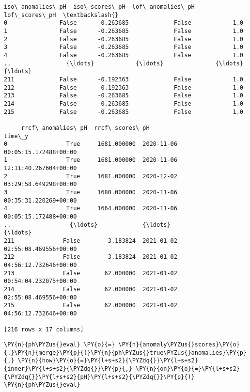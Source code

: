 \begin{tcolorbox}[breakable, size=fbox, boxrule=.5pt, pad at break*=1mm, opacityfill=0]
\begin{Verbatim}[commandchars=\\\{\}]
     iso\_anomalies\_pH  iso\_scores\_pH  lof\_anomalies\_pH  lof\_scores\_pH  \textbackslash{}
0               False      -0.263685             False            1.0
1               False      -0.263685             False            1.0
2               False      -0.263685             False            1.0
3               False      -0.263685             False            1.0
4               False      -0.263685             False            1.0
..                {\ldots}            {\ldots}               {\ldots}            {\ldots}
211             False      -0.192363             False            1.0
212             False      -0.192363             False            1.0
213             False      -0.263685             False            1.0
214             False      -0.263685             False            1.0
215             False      -0.263685             False            1.0

     rrcf\_anomalies\_pH  rrcf\_scores\_pH                            time\_y
0                 True     1681.000000  2020-11-06 00:05:15.172488+00:00
1                 True     1681.000000  2020-11-06 12:11:40.267604+00:00
2                 True     1681.000000  2020-12-02 03:29:58.649298+00:00
3                 True     1680.000000  2020-11-06 00:35:31.220269+00:00
4                 True     1664.000000  2020-11-06 00:05:15.172488+00:00
..                 {\ldots}             {\ldots}                               {\ldots}
211              False        3.183824  2021-01-02 02:55:08.469556+00:00
212              False        3.183824  2021-01-02 04:56:12.732646+00:00
213              False       62.000000  2021-01-02 00:54:04.232075+00:00
214              False       62.000000  2021-01-02 02:55:08.469556+00:00
215              False       62.000000  2021-01-02 04:56:12.732646+00:00

[216 rows x 17 columns]
\end{Verbatim}
\end{tcolorbox}
        
    \begin{tcolorbox}[breakable, size=fbox, boxrule=1pt, pad at break*=1mm,colback=cellbackground, colframe=cellborder]
\begin{Verbatim}[commandchars=\\\{\}]
\PY{n}{ph\PYZus{}eval} \PY{o}{=} \PY{n}{anomaly\PYZus{}scores}\PY{o}{.}\PY{n}{merge}\PY{p}{(}\PY{n}{ph\PYZus{}true\PYZus{}anomalies}\PY{p}{,} \PY{n}{how}\PY{o}{=}\PY{l+s+s2}{\PYZdq{}}\PY{l+s+s2}{inner}\PY{l+s+s2}{\PYZdq{}}\PY{p}{,} \PY{n}{on}\PY{o}{=}\PY{l+s+s2}{\PYZdq{}}\PY{l+s+s2}{pH}\PY{l+s+s2}{\PYZdq{}}\PY{p}{)}
\PY{n}{ph\PYZus{}eval}
\end{Verbatim}
\end{tcolorbox}

